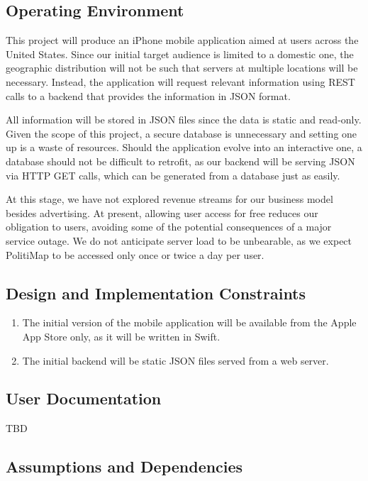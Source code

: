 \documentclass[12pt,oneside,letterpaper]{article}
\newcounter{use_case}
\begin{document}
\subsection{Operating Environment}
This project will produce an iPhone mobile application aimed at
users across the United States. Since our initial target audience is
limited to a domestic one, the geographic distribution will not be such
that servers at multiple locations will be necessary. Instead, the
application will request relevant information using REST calls to a
backend that provides the information in JSON format.

All information will be stored in JSON files since the data is static
and read-only. Given the scope of this project, a secure database is
unnecessary and setting one up is a waste of resources.  Should the
application evolve into an interactive one, a database should not be
difficult to retrofit, as our backend will be serving JSON via HTTP GET
calls, which can be generated from a database just as easily.

At this stage, we have not explored revenue streams for our business
model besides advertising. At present, allowing user access for free
reduces our obligation to users, avoiding some of the potential
consequences of a major service outage. We do not anticipate server
load to be unbearable, as we expect PolitiMap to be accessed only once
or twice a day per user.

\subsection{Design and Implementation Constraints}
\begin{enumerate}
\item The initial version of the mobile application will be available
  from the Apple App Store only, as it will be written in Swift.
\item The initial backend will be static JSON files served from a web
  server.
\end{enumerate}

\subsection{User Documentation}
TBD

\subsection{Assumptions and Dependencies}
\end{document}
